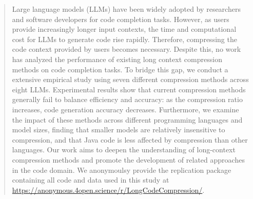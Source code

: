 \begin{abstract}
Large language models (LLMs) have been widely adopted by researchers and software developers for code completion tasks. However, as users provide increasingly longer input contexts, the time and computational cost for LLMs to generate code rise rapidly. Therefore, compressing the code context provided by users becomes necessary. 
Despite this, no work has analyzed the performance of existing long context compression methods on code completion tasks. To bridge this gap, we conduct a extensive empirical study using seven different compression methods across eight LLMs. 
Experimental results show that current compression methods generally fail to balance efficiency and accuracy: as the compression ratio increases, code generation accuracy decreases. Furthermore, we examine the impact of these methods across different programming languages and model sizes, finding that smaller models are relatively insensitive to compression, and that Java code is less affected by compression than other languages. Our work aims to deepen the understanding of long-context compression methods and promote the development of related approaches in the code domain. We anonymoulsy provide the replication package containing all code and data used in this study at \url{https://anonymous.4open.science/r/LongCodeCompression/}. 
\end{abstract}